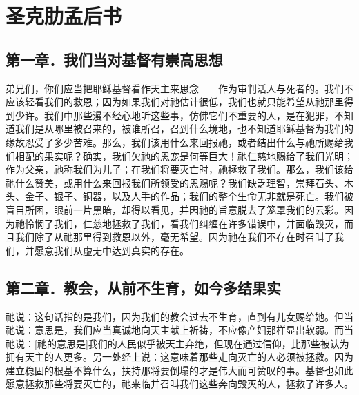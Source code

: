 
\chapter{圣克肋孟后书}



\section{第一章．我们当对基督有崇高思想}

弟兄们，你们应当把耶稣基督看作天主来思念——作为审判活人与死者的。我们不应该轻看我们的救恩；因为如果我们对祂估计很低，我们也就只能希望从祂那里得到少许。我们中那些漫不经心地听这些事，仿佛它们不重要的人，是在犯罪，不知道我们是从哪里被召来的，被谁所召，召到什么境地，也不知道耶稣基督为我们的缘故忍受了多少苦难。那么，我们该用什么来回报祂，或者结出什么与祂所赐给我们相配的果实呢？确实，我们欠祂的恩宠是何等巨大！祂仁慈地赐给了我们光明；作为父亲，祂称我们为儿子；在我们将要灭亡时，祂拯救了我们。那么，我们该给祂什么赞美，或用什么来回报我们所领受的恩赐呢？我们缺乏理智，崇拜石头、木头、金子、银子、铜器，以及人手的作品；我们的整个生命无非就是死亡。我们被盲目所困，眼前一片黑暗，却得以看见，并因祂的旨意脱去了笼罩我们的云彩。因为祂怜悯了我们，仁慈地拯救了我们，看我们纠缠在许多错误中，并面临毁灭，而且我们除了从祂那里得到救恩以外，毫无希望。因为祂在我们不存在时召叫了我们，并愿意我们从虚无中达到真实的存在。\par


\section{第二章．教会，从前不生育，如今多结果实}

祂说：这句话指的是我们，因为我们的教会过去不生育，直到有儿女赐给她。但当祂说：意思是，我们应当真诚地向天主献上祈祷，不应像产妇那样显出软弱。而当祂说：[祂的意思是]我们的人民似乎被天主弃绝，但现在通过信仰，比那些被认为拥有天主的人更多。另一处经上说：这意味着那些走向灭亡的人必须被拯救。因为建立稳固的根基不算什么，扶持那将要倒塌的才是伟大而可赞叹的事。基督也如此愿意拯救那些将要灭亡的，祂来临并召叫我们这些奔向毁灭的人，拯救了许多人。\par

